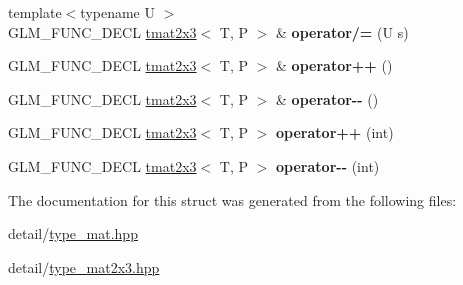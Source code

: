 \begin{DoxyCompactItemize}
\item 
\hypertarget{structglm_1_1tmat2x3_a38e2ae75159a10a3d8883771a3329b29}{{\footnotesize template$<$typename U $>$ }\\G\-L\-M\-\_\-\-F\-U\-N\-C\-\_\-\-D\-E\-C\-L \hyperlink{structglm_1_1tmat2x3}{tmat2x3}$<$ T, P $>$ \& {\bfseries operator/=} (U s)}\label{structglm_1_1tmat2x3_a38e2ae75159a10a3d8883771a3329b29}

\item 
\hypertarget{structglm_1_1tmat2x3_adfa730d2d8797b8450729173e2dd5daf}{G\-L\-M\-\_\-\-F\-U\-N\-C\-\_\-\-D\-E\-C\-L \hyperlink{structglm_1_1tmat2x3}{tmat2x3}$<$ T, P $>$ \& {\bfseries operator++} ()}\label{structglm_1_1tmat2x3_adfa730d2d8797b8450729173e2dd5daf}

\item 
\hypertarget{structglm_1_1tmat2x3_a368cfdd15cde53032b552a0db38540de}{G\-L\-M\-\_\-\-F\-U\-N\-C\-\_\-\-D\-E\-C\-L \hyperlink{structglm_1_1tmat2x3}{tmat2x3}$<$ T, P $>$ \& {\bfseries operator-\/-\/} ()}\label{structglm_1_1tmat2x3_a368cfdd15cde53032b552a0db38540de}

\item 
\hypertarget{structglm_1_1tmat2x3_a81a6a6bb9f34bcf06ba3cc98267cee51}{G\-L\-M\-\_\-\-F\-U\-N\-C\-\_\-\-D\-E\-C\-L \hyperlink{structglm_1_1tmat2x3}{tmat2x3}$<$ T, P $>$ {\bfseries operator++} (int)}\label{structglm_1_1tmat2x3_a81a6a6bb9f34bcf06ba3cc98267cee51}

\item 
\hypertarget{structglm_1_1tmat2x3_a467fb05455a59a92ac0696e4696938b3}{G\-L\-M\-\_\-\-F\-U\-N\-C\-\_\-\-D\-E\-C\-L \hyperlink{structglm_1_1tmat2x3}{tmat2x3}$<$ T, P $>$ {\bfseries operator-\/-\/} (int)}\label{structglm_1_1tmat2x3_a467fb05455a59a92ac0696e4696938b3}

\end{DoxyCompactItemize}


The documentation for this struct was generated from the following files\-:\begin{DoxyCompactItemize}
\item 
detail/\hyperlink{type__mat_8hpp}{type\-\_\-mat.\-hpp}\item 
detail/\hyperlink{type__mat2x3_8hpp}{type\-\_\-mat2x3.\-hpp}\end{DoxyCompactItemize}

